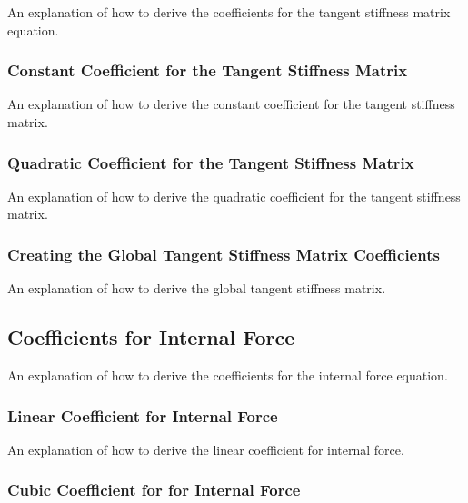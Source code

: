 \documentclass[twocolumn,10pt]{asme2ej}
\begin{document}
An explanation of how to derive the coefficients for the tangent stiffness matrix equation.

\subsubsection{Constant Coefficient for the Tangent Stiffness Matrix}

An explanation of how to derive the constant coefficient for the tangent stiffness matrix.

\subsubsection{Quadratic Coefficient for the Tangent Stiffness Matrix}

An explanation of how to derive the quadratic coefficient for the tangent stiffness matrix.

\subsubsection{Creating the Global Tangent Stiffness Matrix Coefficients}

An explanation of how to derive the global tangent stiffness matrix.

\subsection{Coefficients for Internal Force}

An explanation of how to derive the coefficients for the internal force equation.

\subsubsection{Linear Coefficient for Internal Force}

An explanation of how to derive the linear coefficient for internal force.

\subsubsection{Cubic Coefficient for for Internal Force}
\end{document}
